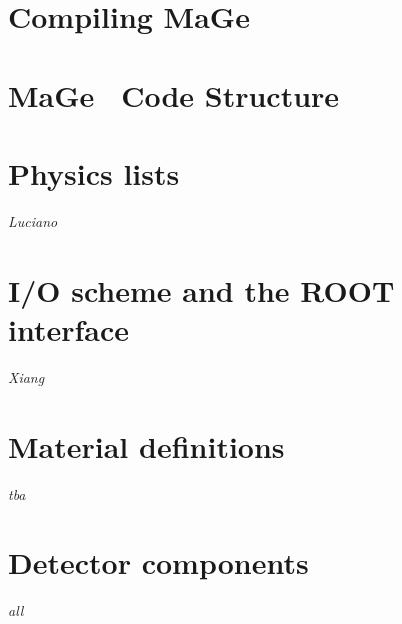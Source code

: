 \documentclass[11pt, a4paper]{book}
\newcommand{\mage}     {{\sc MaGe }}
\begin{document}
\chapter{Compiling \mage} 
\label{chapter:compiling} 



\chapter{\mage~Code Structure} 
\label{chapter:codestructure} 



\chapter{Physics lists}
\label{chapter:physics}
{\it Luciano} \\ 



\chapter{I/O scheme and the ROOT interface}
\label{chapter:io}
{\it Xiang} \\ 



\chapter{Material definitions}
\label{chapter:materials}
{\it tba} \\ 




\chapter{Detector components}
\label{chapter:detector}
{\it all} \\ 

\end{document}
